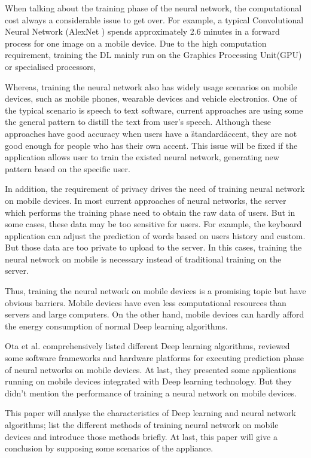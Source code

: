 \documentclass[article]{aaltoseries}
\begin{document}
When talking about the training phase of the neural network, the computational cost always a considerable
issue to get over. For example, a typical Convolutional Neural Network (AlexNet \cite{NIPS2012_4824}) 
spends approximately 2.6 minutes in a forward process for one image on a mobile device\cite{lane2015early}.
Due to the high computation requirement, training the DL mainly run on the Graphics Processing Unit(GPU) or specialised processors, 


Whereas, training the neural network also has widely usage scenarios on mobile devices, 
such as mobile phones, wearable devices and vehicle electronics. 
One of the typical scenario is speech to text software, current approaches are using some the general 
pattern to distill the text from user's speech. Although these approaches have good accuracy when users have
a \"standard\" accent, they are not good enough for people who has their own accent. This issue will be
fixed if the application allows user to train the existed neural network, generating new pattern based on 
the specific user.

In addition, the requirement of privacy drives the need of training neural network on mobile devices.
In most current approaches of neural networks, the server which performs the training phase need to obtain
the raw data of users. But in some cases, these data may be too sensitive for users. For example, the keyboard
application can adjust the prediction of words based on users history and custom. But those data are too 
private to upload to the server. In this cases, training the neural network on mobile is necessary instead of 
traditional training on the server.


Thus, training the neural network on mobile devices is a promising topic but have obvious barriers. 
Mobile devices have even less computational resources than 
servers and large computers. On the other hand, mobile devices can hardly afford the energy consumption
of normal Deep learning algorithms. 

Ota et al.\cite{Ota:2017} comprehensively listed different Deep learning algorithms,
reviewed some software frameworks and hardware platforms for executing prediction phase of neural networks on mobile devices.
At last, they presented some applications running on mobile devices integrated with Deep learning technology. 
But they didn't mention the performance of training a neural network on mobile devices. 

This paper will analyse the characteristics of Deep learning and neural network algorithms;
list the different methods of training neural network on mobile devices and introduce those methods briefly. 
At last, this paper will give a conclusion by supposing some scenarios of the appliance.
\end{document}
